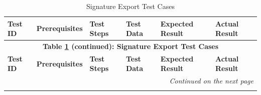 \documentclass[]{final_report}
\theoremstyle{definition}
\begin{document}
\begin{longtable}{|l|p{2cm}|p{2cm}|p{2cm}|p{2cm}|p{3cm}|}
  \caption{Signature Export Test Cases} \label{tab:signature_export} \\
  \hline
  \small\textbf{Test ID} & \small\textbf{Prerequisites} & \small\textbf{Test Steps} & \small\textbf{Test Data} & \small\textbf{Expected Result} & \small\textbf{Actual Result} \\
  \hline
  \endfirsthead

  \multicolumn{6}{c}{\textbf{Table \ref{tab:signature_export} (continued): Signature Export Test Cases}} \\
  \hline
  \small\textbf{Test ID} & \small\textbf{Prerequisites} & \small\textbf{Test Steps} & \small\textbf{Test Data} & \small\textbf{Expected Result} & \small\textbf{Actual Result} \\
  \hline
  \endhead

  \hline
  \multicolumn{6}{r}{\textit{Continued on the next page}} \\
  \endfoot

  \hline
  \endlastfoot


\end{longtable}
\end{document}
